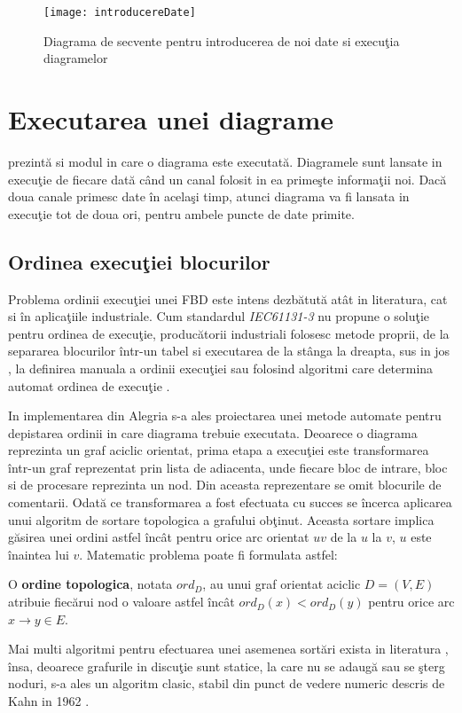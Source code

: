 \begin{landscape}
	\begin{figure}
		\centering
		\texttt{[image: introducereDate]}
		\caption{Diagrama de secvente pentru introducerea de noi date si execuţia diagramelor}
		\label{fig:intrareDate}
	\end{figure}
\end{landscape}

\section{Executarea unei diagrame} 
 prezintă si modul in care o diagrama este executată. Diagramele sunt lansate in execuţie de fiecare dată când un canal folosit in ea primeşte informaţii noi. Dacă doua canale primesc date în acelaşi timp, atunci diagrama va fi lansata in execuţie tot de doua ori, pentru ambele puncte de date primite.

\subsection{Ordinea execuţiei blocurilor}
Problema ordinii execuţiei unei FBD este intens dezbătută atât in literatura, cat si în aplicaţiile industriale. Cum standardul \textit{IEC61131-3} \autocite{IEC61131-3} nu propune o soluţie pentru ordinea de execuţie, producătorii industriali folosesc metode proprii, de la separarea blocurilor într-un tabel si executarea de la stânga la dreapta, sus in jos \autocite[11]{TM241}, la definirea manuala a ordinii execuţiei \autocite[11]{Logix5000} sau folosind algoritmi care determina automat ordinea de execuţie \autocite[5]{GEFANUC}.

In implementarea din Alegria s-a ales proiectarea unei metode automate pentru depistarea ordinii in care diagrama trebuie executata. Deoarece o diagrama reprezinta un graf aciclic orientat, prima etapa a execuţiei este transformarea într-un graf reprezentat prin lista de adiacenta, unde fiecare bloc de intrare, bloc si de procesare reprezinta un nod. Din aceasta reprezentare se omit blocurile de comentarii. Odată ce transformarea a fost efectuata cu succes se încerca aplicarea unui algoritm de sortare topologica\autocite{toposort} a grafului obţinut. Aceasta sortare implica găsirea unei ordini astfel încât pentru orice arc orientat $uv$ de la  $u$ la $v$, $u$ este înaintea lui $v$. 
Matematic problema poate fi formulata astfel:

\begin{definition} 
O \textbf{ordine topologica}, notata $ord_D$, au unui graf orientat aciclic $D = (V,E)$ atribuie fiecărui nod o valoare astfel încât $ord_D(x) < ord_D(y)$ pentru orice arc $ x \rightarrow y \in E$.
\end{definition}
Mai multi algoritmi pentru efectuarea unei asemenea sortări exista in literatura \autocite{toposortArticle}, însa, deoarece grafurile in discuţie sunt statice, la care nu se adaugă sau se şterg noduri, s-a ales un algoritm clasic, stabil din punct de vedere numeric descris de Kahn in 1962 \autocite{topoKahn}.

